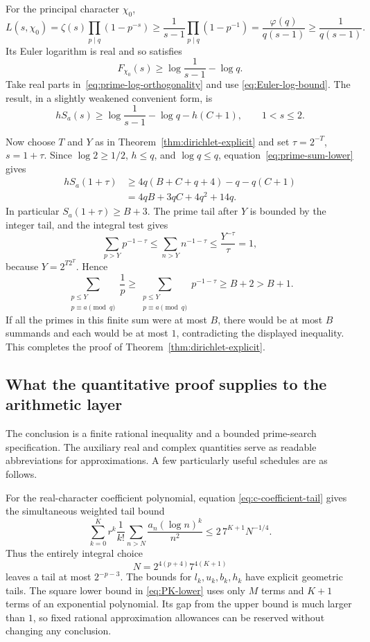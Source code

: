 For the principal character $\chi_0$,
\[
 L(s,\chi_0)=\zeta(s)\prod_{p\mid q}(1-p^{-s})
  \geq\frac1{s-1}\prod_{p\mid q}(1-p^{-1})
  =\frac{\varphi(q)}{q(s-1)}\geq\frac1{q(s-1)}.
\]
Its Euler logarithm is real and so satisfies
\[
 F_{\chi_0}(s)\geq\log\frac1{s-1}-\log q.
\]
Take real parts in~\eqref{eq:prime-log-orthogonality} and use
\eqref{eq:Euler-log-bound}.  The result, in a slightly weakened convenient
form, is
\begin{equation}
 hS_a(s)\geq\log\frac1{s-1}-\log q-h(C+1),
 \qquad 1<s\leq2.
 \label{eq:prime-sum-lower}
\end{equation}

Now choose $T$ and $Y$ as in Theorem~\ref{thm:dirichlet-explicit} and set
$\tau=2^{-T}$, $s=1+\tau$.  Since $\log2\geq1/2$, $h\leq q$, and
$\log q\leq q$, equation~\eqref{eq:prime-sum-lower} gives
\begin{align*}
 hS_a(1+\tau)
 &\geq4q(B+C+q+4)-q-q(C+1)\\
 &=4qB+3qC+4q^2+14q.
\end{align*}
In particular $S_a(1+\tau)\geq B+3$.  The prime tail after $Y$ is bounded
by the integer tail, and the integral test gives
\[
 \sum_{p>Y}p^{-1-\tau}
 \leq\sum_{n>Y}n^{-1-\tau}
 \leq\frac{Y^{-\tau}}\tau=1,
\]
because $Y=2^{T2^T}$.  Hence
\[
 \sum_{\substack{p\leq Y\\p\equiv a\pmod q}}\frac1p
 \geq\sum_{\substack{p\leq Y\\p\equiv a\pmod q}}p^{-1-\tau}
 \geq B+2>B+1.
\]
If all the primes in this finite sum were at most $B$, there would be at
most $B$ summands and each would be at most $1$, contradicting the displayed
inequality.  This completes the proof of
Theorem~\ref{thm:dirichlet-explicit}.

\subsection{What the quantitative proof supplies to the arithmetic layer}

The conclusion is a finite rational inequality and a bounded prime-search
specification.  The auxiliary real and complex quantities serve as readable
abbreviations for approximations.  A few particularly useful schedules are
as follows.

For the real-character coefficient polynomial, equation
\eqref{eq:c-coefficient-tail} gives the simultaneous weighted tail bound
\[
 \sum_{k=0}^K r^k\frac1{k!}
     \sum_{n>N}\frac{a_n(\log n)^k}{n^2}
 \leq2\,7^{K+1}N^{-1/4}.
\]
Thus the entirely integral choice
\[
 N=2^{4(p+4)}7^{4(K+1)}
\]
leaves a tail at most $2^{-p-3}$.  The bounds for $l_k,u_k,b_k,h_k$ have
explicit geometric tails.  The square lower bound in
\eqref{eq:PK-lower} uses only $M$ terms and $K+1$ terms of an exponential
polynomial.  Its gap from the upper bound is much larger than $1$, so fixed
rational approximation allowances can be reserved without changing any
conclusion.

